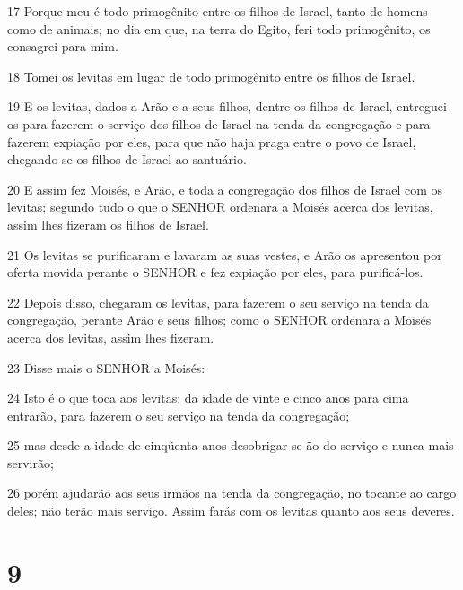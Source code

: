 \par 17 Porque meu é todo primogênito entre os filhos de Israel, tanto de homens como de animais; no dia em que, na terra do Egito, feri todo primogênito, os consagrei para mim.
\par 18 Tomei os levitas em lugar de todo primogênito entre os filhos de Israel.
\par 19 E os levitas, dados a Arão e a seus filhos, dentre os filhos de Israel, entreguei-os para fazerem o serviço dos filhos de Israel na tenda da congregação e para fazerem expiação por eles, para que não haja praga entre o povo de Israel, chegando-se os filhos de Israel ao santuário.
\par 20 E assim fez Moisés, e Arão, e toda a congregação dos filhos de Israel com os levitas; segundo tudo o que o SENHOR ordenara a Moisés acerca dos levitas, assim lhes fizeram os filhos de Israel.
\par 21 Os levitas se purificaram e lavaram as suas vestes, e Arão os apresentou por oferta movida perante o SENHOR e fez expiação por eles, para purificá-los.
\par 22 Depois disso, chegaram os levitas, para fazerem o seu serviço na tenda da congregação, perante Arão e seus filhos; como o SENHOR ordenara a Moisés acerca dos levitas, assim lhes fizeram.
\par 23 Disse mais o SENHOR a Moisés:
\par 24 Isto é o que toca aos levitas: da idade de vinte e cinco anos para cima entrarão, para fazerem o seu serviço na tenda da congregação;
\par 25 mas desde a idade de cinqüenta anos desobrigar-se-ão do serviço e nunca mais servirão;
\par 26 porém ajudarão aos seus irmãos na tenda da congregação, no tocante ao cargo deles; não terão mais serviço. Assim farás com os levitas quanto aos seus deveres.

\chapter{9}

